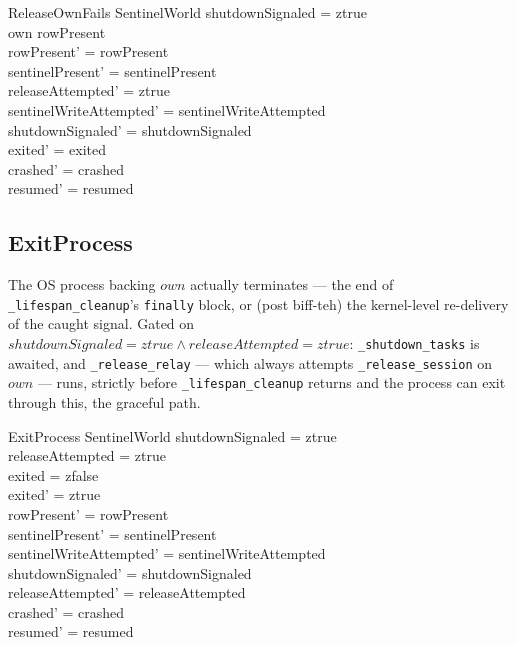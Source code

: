 \documentclass[a4paper,10pt,fleqn]{article}
\begin{document}
\begin{schema}{ReleaseOwnFails}
  \Delta SentinelWorld
  \where
  shutdownSignaled = ztrue \\
  own \in rowPresent \\
  rowPresent' = rowPresent \\
  sentinelPresent' = sentinelPresent \\
  releaseAttempted' = ztrue \\
  sentinelWriteAttempted' = sentinelWriteAttempted \\
  shutdownSignaled' = shutdownSignaled \\
  exited' = exited \\
  crashed' = crashed \\
  resumed' = resumed
\end{schema}

\subsection{ExitProcess}

The OS process backing $own$ actually terminates --- the end of
\texttt{\_lifespan\_cleanup}'s \texttt{finally} block, or (post
biff-teh) the kernel-level re-delivery of the caught signal.  Gated on
$shutdownSignaled = ztrue \land releaseAttempted = ztrue$:
\texttt{\_shutdown\_tasks} is awaited, and \texttt{\_release\_relay} ---
which always attempts \texttt{\_release\_session} on $own$ --- runs,
strictly before \texttt{\_lifespan\_cleanup} returns and the process can
exit through this, the graceful path.

\begin{schema}{ExitProcess}
  \Delta SentinelWorld
  \where
  shutdownSignaled = ztrue \\
  releaseAttempted = ztrue \\
  exited = zfalse \\
  exited' = ztrue \\
  rowPresent' = rowPresent \\
  sentinelPresent' = sentinelPresent \\
  sentinelWriteAttempted' = sentinelWriteAttempted \\
  shutdownSignaled' = shutdownSignaled \\
  releaseAttempted' = releaseAttempted \\
  crashed' = crashed \\
  resumed' = resumed
\end{schema}
\end{document}
